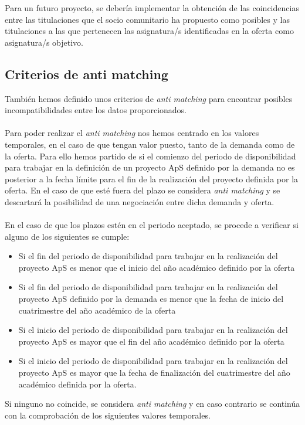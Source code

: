 \documentclass[11pt]{book}
\begin{document}
	Para un futuro proyecto, se debería implementar la obtención de las coincidencias entre las
	titulaciones que el socio comunitario ha propuesto como posibles y las
	titulaciones a las que pertenecen las asignatura/s identificadas en la
	oferta como asignatura/s objetivo. 

\subsection{Criterios de anti matching }

También hemos definido unos criterios de \emph{anti matching} para encontrar posibles incompatibilidades entre los datos proporcionados.\\\\
Para poder realizar el \emph{anti matching} nos hemos centrado en los valores temporales, en el caso de que tengan valor puesto, tanto de la demanda como de la oferta. Para ello hemos partido de si el comienzo del periodo de disponibilidad para trabajar en la definición
de un proyecto ApS definido por la demanda no es posterior a la fecha límite para el fin de la realización del proyecto definida por la oferta. En el caso de que esté fuera del plazo se considera \emph{anti matching} y se descartará la posibilidad de una negociación entre dicha demanda y oferta. \\\\

En el caso de que los plazos estén en el periodo aceptado, se procede a verificar si alguno de los siguientes se cumple:
\begin{itemize}
	\item Si el fin del periodo de disponibilidad para trabajar en la realización del proyecto ApS es menor que el inicio del año académico definido por la oferta
	\item Si el fin del periodo de disponibilidad para trabajar en la realización del
	proyecto ApS definido por la demanda es menor que la fecha de inicio del cuatrimestre del año académico de la oferta 
	\item Si el inicio del periodo de disponibilidad para trabajar en la realización del
	proyecto ApS es mayor que el fin del año académico definido por la oferta 
	\item Si el inicio del periodo de disponibilidad para trabajar en la realización del
	proyecto ApS es mayor que la fecha de finalización del cuatrimestre del año académico definida por la  oferta.\\
\end{itemize}
 Si ninguno no coincide, se considera \emph{anti matching} y en caso contrario se continúa con la comprobación de los siguientes valores temporales.\\\\
\end{document}

